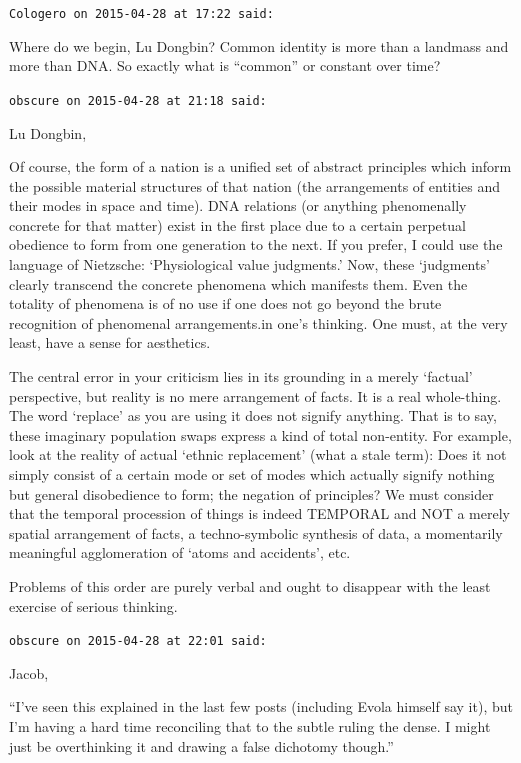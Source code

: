 \begin{footnotesize}
\begin{sffamily}
\hfill

\texttt{Cologero on 2015-04-28 at 17:22 said:}

Where do we begin, Lu Dongbin? Common identity is more than a landmass and more than DNA. So exactly what is ``common'' or constant over time?

\hfill

\texttt{obscure on 2015-04-28 at 21:18 said:}

Lu Dongbin,

Of course, the form of a nation is a unified set of abstract principles which inform the possible material structures of that nation (the arrangements of entities and their modes in space and time). DNA relations (or anything phenomenally concrete for that matter) exist in the first place due to a certain perpetual obedience to form from one generation to the next. If you prefer, I could use the language of Nietzsche: `Physiological value judgments.' Now, these `judgments' clearly transcend the concrete phenomena which manifests them. Even the totality of phenomena is of no use if one does not go beyond the brute recognition of phenomenal arrangements.in one's thinking. One must, at the very least, have a sense for aesthetics.

The central error in your criticism lies in its grounding in a merely `factual' perspective, but reality is no mere arrangement of facts. It is a real whole-thing. The word `replace' as you are using it does not signify anything. That is to say, these imaginary population swaps express a kind of total non-entity. For example, look at the reality of actual `ethnic replacement' (what a stale term): Does it not simply consist of a certain mode or set of modes which actually signify nothing but general disobedience to form; the negation of principles? We must consider that the temporal procession of things is indeed TEMPORAL and NOT a merely spatial arrangement of facts, a techno-symbolic synthesis of data, a momentarily meaningful agglomeration of `atoms and accidents', etc.

Problems of this order are purely verbal and ought to disappear with the least exercise of serious thinking.

\hfill

\texttt{obscure on 2015-04-28 at 22:01 said:}

Jacob,

``I've seen this explained in the last few posts (including Evola himself say it), but I'm having a hard time reconciling that to the subtle ruling the dense. I might just be overthinking it and drawing a false dichotomy though.''


\end{sffamily}
\end{footnotesize}
